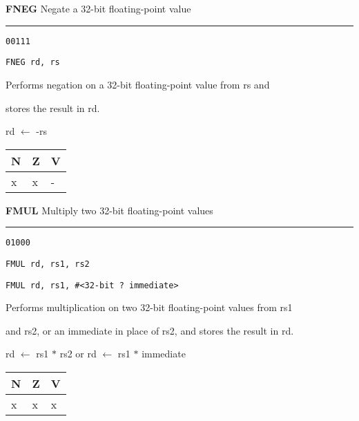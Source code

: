 \documentclass{article}
\begin{document}
\flushleft
\LARGE\textbf{FNEG} \large \hfill Negate a 32-bit floating-point value

\kern-3pt
\noindent\rule{16.5cm}{0.4pt}
\normalsize

{\large
	 \texttt{00111} \par
	\smallbreak
	 \texttt{FNEG rd, rs} \par
	\smallbreak
	 Performs negation on a 32-bit floating-point value from rs and \par
	\makebox[3.5cm][l]{  } stores the result in rd. \par
	\smallbreak
	 rd $\leftarrow$ -rs \par 
	\smallbreak
	 \begin{tabular}{lll} N \quad & Z \quad & V \\ \hline x & x & - \\ \end{tabular}
}

\pagebreak

\flushleft
\LARGE\textbf{FMUL} \large \hfill Multiply two 32-bit floating-point values

\kern-3pt
\noindent\rule{16.5cm}{0.4pt}
\normalsize

{\large
	 \texttt{01000} \par
	\smallbreak
	 \texttt{FMUL rd, rs1, rs2} \par
	\smallbreak
	 \texttt{FMUL rd, rs1, \#<32-bit ? immediate>} \par
	\smallbreak
	 Performs multiplication on two 32-bit floating-point values from rs1 \par
	\makebox[3.5cm][l]{  } and rs2, or an immediate in place of rs2, and stores the result in rd. \par
	\smallbreak
	 rd $\leftarrow$ rs1 $*$ rs2 \quad or \quad rd $\leftarrow$ rs1 $*$ immediate\par
	\smallbreak
	 \begin{tabular}{lll} N \quad & Z \quad & V \\ \hline x & x & x \\ \end{tabular}
}

\bigskip\bigskip
\end{document}
